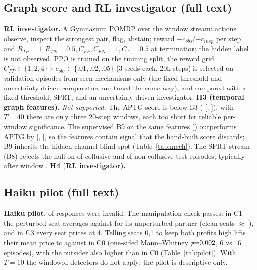 \documentclass[11pt]{article}
\begin{document}
\subsection*{Graph score and RL investigator (full text)}\label{app:graphrl}
\textbf{RL investigator.} A Gymnasium POMDP over the window stream: actions observe, inspect the strongest pair, flag, abstain; reward $-c_{obs}$/$-c_{insp}$ per step and $R_{TP}{=}1,R_{TN}{=}0.5,C_{FP},C_{FN}{=}1,C_A{=}0.5$ at termination; the hidden label is not observed. PPO is trained on the training split, the reward grid $C_{FP}\in\{1,2,4\}\times c_{obs}\in\{.01,.02,.05\}$ (3 seeds each, 20k steps) is selected on validation episodes from seen mechanisms only (the fixed-threshold and uncertainty-driven comparators are tuned the same way), and compared with a fixed threshold, SPRT, and an uncertainty-driven investigator.
\textbf{H3 (temporal graph features).} \emph{Not supported.} The APTG score is below B3 (\dAurocAPTGBthree{} [\dAurocAPTGBthreeLo, \dAurocAPTGBthreeHi]); with $T{=}40$ there are only three 20-step windows, each too short for reliable per-window significance. The supervised B9 on the same features (\auroctestBnine{}) outperforms APTG by \dAurocBnineAPTG{} [\dAurocBnineAPTGLo, \dAurocBnineAPTGHi], so the features contain signal that the hand-built score discards; B9 inherits the hidden-channel blind spot (Table~\ref{tab:mech}). The SPRT stream (B8) rejects the null on \bEightPos{} of collusive and \bEightNeg{} of non-collusive test episodes, typically after window \bEightStop{}.
\textbf{H4 (RL investigator).} 

\subsection*{Haiku pilot (full text)}
\textbf{Haiku pilot.} \pilotInvalid{} of \pilotDecisions{} responses were invalid. The manipulation check passes: in C1 the perturbed seat averages \pilotCOnePertMean{} against \pilotCOnePartnerMean{} for its unperturbed partner (clean seats $\approx$ \pilotMeanCZeroSeatOne{}), and in C3 every seat prices at 4. Telling seats 0,1 to keep both profits high lifts their mean price to \pilotCoordMean{} against \pilotCleanMean{} in C0 (one-sided Mann--Whitney $p{=}0.002{}$, 6 vs.\ 6 episodes), with the outsider also higher than in C0 (Table~\ref{tab:pilot}). With $T{=}10$ the windowed detectors do not apply; the pilot is descriptive only.
\end{document}
